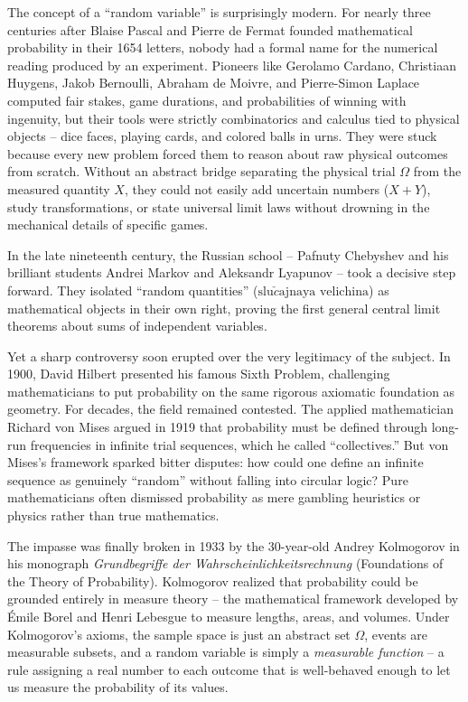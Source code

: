 \begin{historybox}
The concept of a ``random variable'' is surprisingly modern. For nearly three centuries
after Blaise Pascal and Pierre de Fermat founded mathematical probability in their 1654
letters, nobody had a formal name for the numerical reading produced by an experiment.
Pioneers like Gerolamo Cardano, Christiaan Huygens, Jakob Bernoulli, Abraham de Moivre,
and Pierre-Simon Laplace computed fair stakes, game durations, and probabilities of
winning with ingenuity, but their tools were strictly combinatorics and
calculus tied to physical objects -- dice faces, playing cards, and colored balls in
urns. They were stuck because every new problem forced them to reason about raw physical
outcomes from scratch. Without an abstract bridge separating the physical trial
$\Omega$ from the measured quantity $X$, they could not easily add uncertain numbers
($X+Y$), study transformations, or state universal limit laws without drowning in the
mechanical details of specific games.

In the late nineteenth century, the Russian school -- Pafnuty Chebyshev and his brilliant
students Andrei Markov and Aleksandr Lyapunov -- took a decisive step forward. They
isolated ``random quantities'' ($\text{slu}\check{c}\text{ajnaya velichina}$) as
mathematical objects in their own right, proving the first general central limit
theorems about sums of independent variables.

Yet a sharp controversy soon erupted over the very legitimacy of the subject. In 1900,
David Hilbert presented his famous Sixth Problem, challenging mathematicians to put
probability on the same rigorous axiomatic foundation as geometry. For decades, the
field remained contested. The applied mathematician Richard von Mises argued in 1919
that probability must be defined through long-run frequencies in infinite trial
sequences, which he called ``collectives.'' But von Mises's framework sparked bitter
disputes: how could one define an infinite sequence as genuinely ``random'' without
falling into circular logic? Pure mathematicians often dismissed probability as mere
gambling heuristics or physics rather than true mathematics.

The impasse was finally broken in 1933 by the 30-year-old Andrey Kolmogorov in his
monograph \emph{Grundbegriffe der Wahrscheinlichkeitsrechnung} (Foundations of the Theory
of Probability). Kolmogorov realized that probability could be grounded entirely in
measure theory -- the mathematical framework developed by \'Emile Borel and Henri Lebesgue
to measure lengths, areas, and volumes. Under Kolmogorov's axioms, the sample space is
just an abstract set $\Omega$, events are measurable subsets, and a random variable is
simply a \emph{measurable function} -- a rule assigning a real number to each outcome
that is well-behaved enough to let us measure the probability of its values.


\end{historybox}
